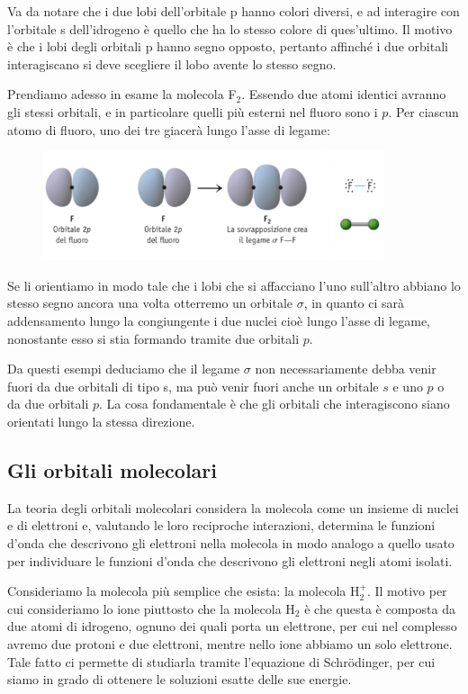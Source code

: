 Va da notare che i due lobi dell'orbitale p hanno colori diversi, e ad interagire con l'orbitale s dell'idrogeno è quello che ha lo stesso colore di ques'ultimo. Il motivo è che i lobi degli orbitali p hanno segno opposto, pertanto affinché i due orbitali interagiscano si deve scegliere il lobo avente lo stesso segno.

\vspace{0.2cm} Prendiamo adesso in esame la molecola F$_2$. Essendo due atomi identici avranno gli stessi orbitali, e in particolare quelli più esterni nel fluoro sono i $p$. Per ciascun atomo di fluoro, uno dei tre giacerà lungo l'asse di legame:
\begin{figure}[htp]
    \centering
    \includegraphics[width=10cm]{immagini/legame-F_2.png}
\end{figure}

Se li orientiamo in modo tale che i lobi che si affacciano l'uno sull'altro abbiano lo stesso segno ancora una volta otterremo un orbitale $\sigma$, in quanto ci sarà addensamento lungo la congiungente i due nuclei cioè lungo l'asse di legame, nonostante esso si stia formando tramite due orbitali $p$.

\vspace{0.2cm} Da questi esempi deduciamo che il legame $\sigma$ non necessariamente debba venir fuori da due orbitali di tipo s, ma può venir fuori anche un orbitale $s$ e uno $p$ o da due orbitali $p$. La cosa fondamentale è che gli orbitali che interagiscono siano orientati lungo la stessa direzione.
\subsection{Gli orbitali molecolari}
La teoria degli orbitali molecolari considera la molecola come un insieme di nuclei e di elettroni e,
valutando le loro reciproche interazioni, determina le funzioni d’onda che descrivono gli elettroni nella
molecola in modo analogo a quello usato per individuare le funzioni d’onda che descrivono gli elettroni
negli atomi isolati.

\vspace{0.2cm}Consideriamo la molecola più semplice che esista: la molecola H$_2^+$. Il motivo per cui consideriamo lo ione piuttosto che la molecola H$_2$ è che questa è composta da due atomi di idrogeno, ognuno dei quali porta un elettrone, per cui nel complesso avremo due protoni e due elettroni, mentre nello ione abbiamo un solo elettrone. Tale fatto ci permette di studiarla tramite l'equazione di Schrödinger, per cui siamo in grado di ottenere le soluzioni esatte delle sue energie.

